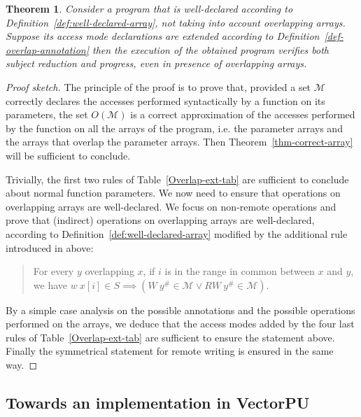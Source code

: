 \documentclass[preprint,12pt]{elsarticle}
\newtheorem{Theorem}{Theorem}
\newcommand{\abs}[1]{#1^\#}
\newcommand{\AM}{\mathcal{M}}
\newcommand{\Overlap}[1]{O(#1)}
\begin{document}
\begin{Theorem}\label{thm-correct-array-overlap}
Consider a program that is well-declared according to Definition~\ref{def:well-declared-array}, not taking into account  overlapping arrays. Suppose its access mode declarations are extended according to Definition~\ref{def-overlap-annotation} then the execution of the obtained program verifies both subject reduction and progress, even in presence of overlapping arrays.
\end{Theorem}

\begin{proof}[Proof sketch]
The principle of the proof is to prove that, provided a set $\AM$ correctly declares the accesses performed syntactically by a function on its parameters, the set $\Overlap \AM$ is a correct approximation of the accesses performed by the function on all the arrays of the program, i.e. the parameter arrays and the arrays that overlap the parameter arrays. Then Theorem~\ref{thm-correct-array} will be  sufficient to conclude.

Trivially, the first two rules of Table~\ref{Overlap-ext-tab} are sufficient to conclude about normal function parameters. We now need to ensure that operations on overlapping arrays are well-declared. We focus on non-remote operations and prove that (indirect) operations on overlapping arrays are well-declared, according to Definition~\ref{def:well-declared-array} modified by the additional rule introduced in above: 
\begin{quote}
For every $y$ overlapping $x$, if $i$ is in the range in common between $x$ and $y$, we have $w\ x[i]\in S \implies (W\ \abs y \in \AM \lor RW\ \abs y \in \AM)$.
\end{quote}
By a simple case analysis on the possible annotations and the possible operations performed on the arrays, we deduce that the access modes added by the four last rules of Table~\ref{Overlap-ext-tab} are sufficient to ensure the statement above. Finally the symmetrical statement for remote writing is ensured in the same way.
\end{proof}



\subsection{Towards an implementation in VectorPU}
\end{document}
